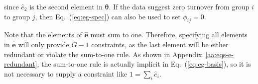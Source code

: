 since $\hat{e}_2$ is the second element in $\bm{\theta}$.
If the data suggest zero turnover from group $i$ to group $j$,
then Eq.~(\ref{eq:eg-spec}) can also be used to set $\phi_{ij} = 0$.
\par
Note that the elements of $\bm{\hat{e}}$ must sum to one.
Therefore, specifying all elements in $\bm{\hat{e}}$
will only provide $G-1$ constraints,
as the last element will be either redundant or violate the sum-to-one rule.
As shown in Appendix~\ref{aa:eqs-e-redundant},
the sum-to-one rule is actually implicit in Eq.~(\ref{eq:eg-basis}),
so it is not necessary to supply a constraint like $1 = \sum_{i} \hat{e}_i$.
